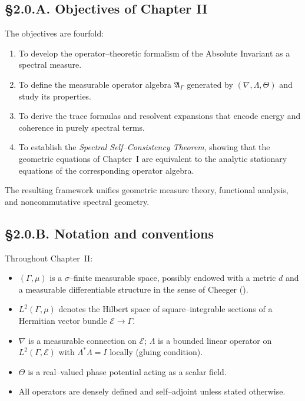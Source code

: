 \subsection*{§2.0.A. Objectives of Chapter II}

The objectives are fourfold:

\begin{enumerate}
  \item To develop the operator–theoretic formalism of the Absolute Invariant as a spectral measure.
  \item To define the measurable operator algebra $\mathfrak{A}_\Gamma$ generated by $(\nabla,\Lambda,\Theta)$ and study its properties.
  \item To derive the trace formulas and resolvent expansions that encode energy and coherence in purely spectral terms.
  \item To establish the \emph{Spectral Self–Consistency Theorem}, showing that the geometric equations of Chapter~I are equivalent to the analytic stationary equations of the corresponding operator algebra.
\end{enumerate}

The resulting framework unifies geometric measure theory, functional analysis, and noncommutative spectral geometry.

\subsection*{§2.0.B. Notation and conventions}

Throughout Chapter~II:

\begin{itemize}
\item $(\Gamma,\mu)$ is a $\sigma$–finite measurable space, possibly endowed with a metric $d$ and a measurable differentiable structure in the sense of Cheeger (\cite{Cheeger1999}).
\item $L^2(\Gamma,\mu)$ denotes the Hilbert space of square–integrable sections of a Hermitian vector bundle $\mathcal{E}\to\Gamma$.
\item $\nabla$ is a measurable connection on $\mathcal{E}$; $\Lambda$ is a bounded linear operator on $L^2(\Gamma,\mathcal{E})$ with $\Lambda^\ast\Lambda=I$ locally (gluing condition).
\item $\Theta$ is a real–valued phase potential acting as a scalar field.
\item All operators are densely defined and self–adjoint unless stated otherwise.
\end{itemize}

